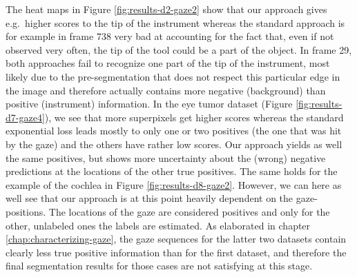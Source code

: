 The heat maps in Figure \ref{fig:results-d2-gaze2} show that our approach gives e.g.\ higher scores to the tip of the instrument whereas the standard approach is for example in frame 738 very bad at accounting for the fact that, even if not observed very often, the tip of the tool could be a part of the object. 
In frame 29, both approaches fail to recognize one part of the tip of the instrument, most likely due to the pre-segmentation that does not respect this particular edge in the image and therefore actually contains more negative (background) than positive (instrument) information.
In the eye tumor dataset (Figure \ref{fig:results-d7-gaze4}), we see that more superpixels get higher scores whereas the standard exponential loss leads mostly to only one or two positives (the one that was hit by the gaze) and the others have rather low scores. 
Our approach yields as well the same positives, but shows more uncertainty about the (wrong) negative predictions at the locations of the other true positives. 
The same holds for the example of the cochlea in Figure \ref{fig:results-d8-gaze2}. 
However, we can here as well see that our approach is at this point heavily dependent on the gaze-positions. 
The locations of the gaze are considered positives and only for the other, unlabeled ones the labels are estimated. 
As elaborated in chapter \ref{chap:characterizing-gaze}, the gaze sequences for the latter two datasets contain clearly less true positive information than for the first dataset, and therefore the final segmentation results for those cases are not satisfying at this stage.

